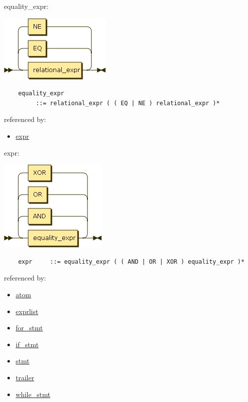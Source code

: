 \begin{minipage}{\textwidth}
    \protect\hypertarget{equality_expr}{}{equality\_expr:}

    \includegraphics[width=2.14583in,height=1.29167in]{diagram/equality_expr.png}

    \begin{verbatim}
    equality_expr
         ::= relational_expr ( ( EQ | NE ) relational_expr )*
    \end{verbatim}

    referenced by:

    \begin{itemize}
            \tightlist
        \item
            \protect\hyperlink{expr}{expr}
    \end{itemize}

\end{minipage}

\begin{minipage}{\textwidth}
    \protect\hypertarget{expr}{}{expr:}

    \includegraphics[width=2.06250in,height=1.75000in]{diagram/expr.png}

    \begin{verbatim}
    expr     ::= equality_expr ( ( AND | OR | XOR ) equality_expr )*
    \end{verbatim}

    referenced by:

    \begin{itemize}
            \tightlist
        \item
            \protect\hyperlink{atom}{atom}
        \item
            \protect\hyperlink{exprlist}{exprlist}
        \item
            \protect\hyperlink{for_stmt}{for\_stmt}
        \item
            \protect\hyperlink{if_stmt}{if\_stmt}
        \item
            \protect\hyperlink{stmt}{stmt}
        \item
            \protect\hyperlink{trailer}{trailer}
        \item
            \protect\hyperlink{while_stmt}{while\_stmt}
    \end{itemize}

\end{minipage}

